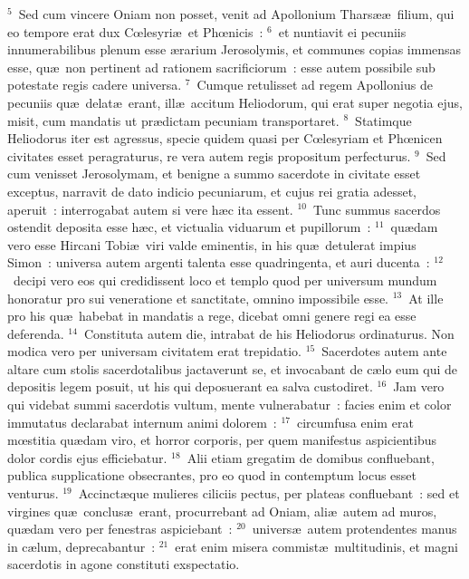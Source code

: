 ${}^{5}$~Sed cum vincere Oniam non posset, venit ad Apollonium Thars\ae \ae\ filium, qui eo tempore erat dux Cœlesyri\ae\ et Phœnicis~:
${}^{6}$~et nuntiavit ei pecuniis innumerabilibus plenum esse \ae rarium Jerosolymis, et communes copias immensas esse, qu\ae\ non pertinent ad rationem sacrificiorum~: esse autem possibile sub potestate regis cadere universa.
${}^{7}$~Cumque retulisset ad regem Apollonius de pecuniis qu\ae\ delat\ae\ erant, ill\ae\ accitum Heliodorum, qui erat super negotia ejus, misit, cum mandatis ut pr\ae dictam pecuniam transportaret.
${}^{8}$~Statimque Heliodorus iter est agressus, specie quidem quasi per Cœlesyriam et Phœnicen civitates esset peragraturus, re vera autem regis propositum perfecturus.
${}^{9}$~Sed cum venisset Jerosolymam, et benigne a summo sacerdote in civitate esset exceptus, narravit de dato indicio pecuniarum, et cujus rei gratia adesset, aperuit~: interrogabat autem si vere h\ae c ita essent.
${}^{10}$~Tunc summus sacerdos ostendit deposita esse h\ae c, et victualia viduarum et pupillorum~:
${}^{11}$~qu\ae dam vero esse Hircani Tobi\ae\ viri valde eminentis, in his qu\ae\ detulerat impius Simon~: universa autem argenti talenta esse quadringenta, et auri ducenta~:
${}^{12}$~decipi vero eos qui credidissent loco et templo quod per universum mundum honoratur pro sui veneratione et sanctitate, omnino impossibile esse.
${}^{13}$~At ille pro his qu\ae\ habebat in mandatis a rege, dicebat omni genere regi ea esse deferenda.
${}^{14}$~Constituta autem die, intrabat de his Heliodorus ordinaturus. Non modica vero per universam civitatem erat trepidatio.
${}^{15}$~Sacerdotes autem ante altare cum stolis sacerdotalibus jactaverunt se, et invocabant de c\ae lo eum qui de depositis legem posuit, ut his qui deposuerant ea salva custodiret.
${}^{16}$~Jam vero qui videbat summi sacerdotis vultum, mente vulnerabatur~: facies enim et color immutatus declarabat internum animi dolorem~:
${}^{17}$~circumfusa enim erat mœstitia qu\ae dam viro, et horror corporis, per quem manifestus aspicientibus dolor cordis ejus efficiebatur.
${}^{18}$~Alii etiam gregatim de domibus confluebant, publica supplicatione obsecrantes, pro eo quod in contemptum locus esset venturus.
${}^{19}$~Accinct\ae que mulieres ciliciis pectus, per plateas confluebant~: sed et virgines qu\ae\ conclus\ae\ erant, procurrebant ad Oniam, ali\ae\ autem ad muros, qu\ae dam vero per fenestras aspiciebant~:
${}^{20}$~univers\ae\ autem protendentes manus in c\ae lum, deprecabantur~:
${}^{21}$~erat enim misera commist\ae\ multitudinis, et magni sacerdotis in agone constituti exspectatio.
